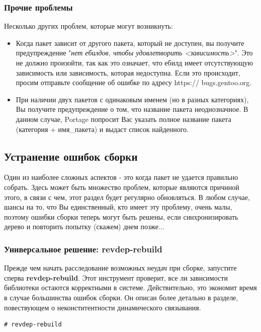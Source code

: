 \documentclass[10pt]{book}
\begin{document}
\subsubsection{Прочие проблемы}

Несколько других проблем, которые могут возникнуть: 

\begin{itemize}
\item Когда пакет зависит от другого пакета, который не доступен, вы получите предупреждение "\textit{нет ебилдов, чтобы удовлетворить <зависимость>}". Это не должно произойти, так как это означает, что ебилд имеет отсутствующую зависимость или зависимость, которая недоступна. Если это происходит, просим отправьте сообщение об ошибке по адресу https:// bugs.gentoo.org. 
\item При наличии двух пакетов с одинаковым именем (но в разных категориях), Вы получите предупреждение о том, что название пакета неоднозначное. В данном случае, Portage попросит Вас указать полное название пакета (категория + имя\_пакета) и выдаст список найденного.
\end{itemize}

\subsection{Устранение ошибок сборки}

Один из наиболее сложных аспектов - это когда пакет не удается правильно собрать. Здесь может быть множество проблем, которые являются причиной этого, в связи с чем, этот раздел будет регулярно обновляться. В любом случае, шансы на то, что Вы единственный, кто имеет эту проблему, очень малы, поэтому ошибки сборки теперь могут быть решены, если синхронизировать дерево и повторить попытку (скажем) днем позже...

\subsubsection{Универсальное решение: revdep-rebuild}

Прежде чем начать расследование возможных неудач при сборке, запустите сперва \textbf{revdep-rebuild}. Этот инструмент проверит, все ли зависимости библиотеки остаются корректными в системе. Действительно, это экономит время в случае большинства ошибок сборки. Он описан более детально в разделе, повествующем о неконститентности динамического связывания.

 \begin{tcolorbox}
\begin{lstlisting}
# revdep-rebuild
\end{lstlisting}
\end{tcolorbox}
\end{document}
